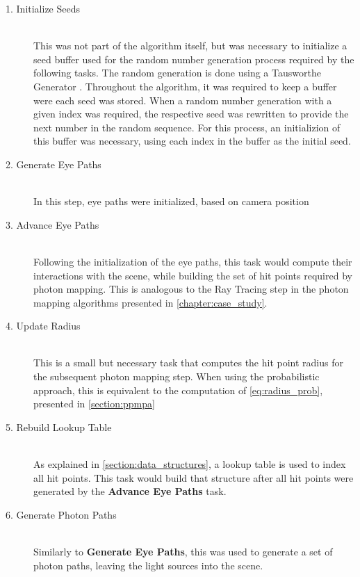 \documentclass[main.tex]{subfiles}
\begin{document}
\begin{description}

\item[1. Initialize Seeds] \hfill \\
  This was not part of the algorithm itself, but was necessary to initialize a seed buffer used for the random number generation process required by the following tasks. The random generation is done using a Tausworthe Generator \cite{tausworthe1965random}. Throughout the algorithm, it was required to keep a buffer were each seed was stored. When a random number generation with a given index was required, the respective seed was rewritten to provide the next number in the random sequence. For this process, an initializion of this buffer was necessary, using each index in the buffer as the initial seed.

\item[2. Generate Eye Paths] \hfill \\
  In this step, eye paths were initialized, based on camera position

\item[3. Advance Eye Paths] \hfill \\
  Following the initialization of the eye paths, this task would compute their interactions with the scene, while building the set of hit points required by photon mapping. This is analogous to the Ray Tracing step in the photon mapping algorithms presented in \cref{chapter:case_study}.

\item[4. Update Radius] \hfill \\
  This is a small but necessary task that computes the hit point radius for the subsequent photon mapping step. When using the probabilistic approach, this is equivalent to the computation of \cref{eq:radius_prob}, presented in \cref{section:ppmpa}

\item[5. Rebuild Lookup Table] \hfill \\
  As explained in \cref{section:data_structures}, a lookup table is used to index all hit points. This task would build that structure after all hit points were generated by the \textbf{Advance Eye Paths} task.

\item[6. Generate Photon Paths] \hfill \\
  Similarly to \textbf{Generate Eye Paths}, this was used to generate a set of photon paths, leaving the light sources into the scene.


\end{description}
\end{document}
